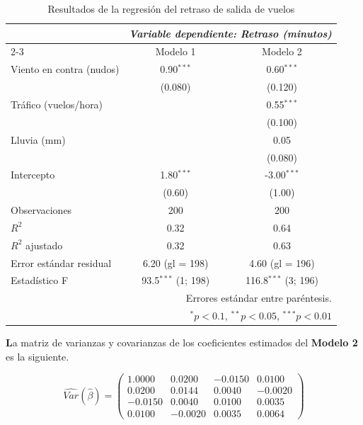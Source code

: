 \documentclass[10pt,a4paper]{article}
\begin{document}
\begin{enumerate}
\begin{table}[H] 
\centering
\caption{Resultados de la regresión del retraso de salida de vuelos}
\label{tab:aviacion_reg}
\begin{tabular}{lcc}
\toprule
 & \multicolumn{2}{c}{\textit{Variable dependiente: Retraso (minutos)}} \\
\cmidrule(lr){2-3}
 & Modelo 1 & Modelo 2 \\
\midrule
Viento en contra (nudos) & 0.90$^{***}$ & 0.60$^{***}$ \\
 & (0.080) & (0.120) \\
Tráfico (vuelos/hora) &  & 0.55$^{***}$ \\
 &  & (0.100) \\
Lluvia (mm) &  & 0.05 \\
 &  & (0.080) \\
Intercepto & 1.80$^{***}$ & -3.00$^{***}$ \\
 & (0.60) & (1.00) \\
\midrule
Observaciones & 200 & 200 \\
$R^2$ & 0.32 & 0.64 \\
$R^2$ ajustado & 0.32 & 0.63 \\
Error estándar residual & 6.20 (gl = 198) & 4.60 (gl = 196) \\
Estadístico F & 93.5$^{***}$ (1; 198) & 116.8$^{***}$ (3; 196) \\
\bottomrule
\multicolumn{3}{r}{\footnotesize Errores estándar entre paréntesis.} \\
\multicolumn{3}{r}{\footnotesize $^{*}p<0.1$, $^{**}p<0.05$, $^{***}p<0.01$}
\end{tabular}
\end{table}

\vspace{0.3cm}

\noindent
\textbf La matriz de varianzas y covarianzas de los coeficientes estimados del \textbf{Modelo 2} es la siguiente.

\[
\widehat{Var}(\hat\beta)=
\begin{pmatrix}
1.0000 & 0.0200 & -0.0150 & 0.0100 \\
0.0200 & 0.0144 & 0.0040 & -0.0020 \\
-0.0150 & 0.0040 & 0.0100 & 0.0035 \\
0.0100 & -0.0020 & 0.0035 & 0.0064
\end{pmatrix}
\]


\end{enumerate}
\end{document}
